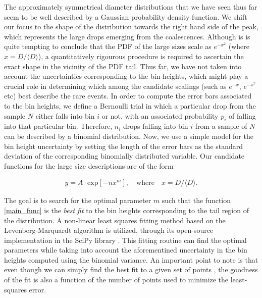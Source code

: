 The approximately symmetrical diameter distributions that we have seen 
thus far seem to be well described by a Gaussian probability density function. 
We shift our focus to the shape of the distribution towards the right hand 
side of the peak, which represents the large drops emerging from the coalescences.
Although is is quite tempting to conclude that the PDF of the large sizes 
scale as $e^{-x^{2}}$ (where $x = D/\langle D \rangle$), a quantitatively rigourous
procedure is required to ascertain the exact shape in the vicinity of the PDF tail.
Thus far, we have not taken into account the uncertainties corresponding to
the bin heights, which might play a crucial role in determining which among
the candidate scalings (such as $ e^{-x}$, $e^{-x^{2}}$ etc) best describe the rare events. 
In order to compute the error bars associated to the bin heights, we define 
a Bernoulli trial in which a particular drop from the sample $N$ either falls into
bin $i$ or not, with an associated probability $p_i$ of falling into that particular bin.
Therefore, $n_i$ drops falling into bin $i$ from a sample of $N$ can be described by a binomial distribution. 
Now, we use a simple model for the bin height uncertainty by setting the length 
of the error bars as the standard deviation 
of the corresponding binomially distributed variable. 
Our candidate functions for the large size descriptions are of the form 

\begin{align}
	y = A \cdot \textrm{exp}\left[-n x^m\right] , \quad \text{where} \quad x = D/\langle D \rangle . 
\label{main_func}
\end{align}

The goal is to search for the optimal parameter $m$ such that the function \eqref{main_func} 
is the \textit{best fit} to the bin heights corresponding to the tail region of the distribution.
A non-linear least squares fitting method based on the Levenberg-Marquardt algorithm 
is utilized, through its open-source implementation in the SciPy library \cite{scipy}. 
This fitting routine can find the optimal parameters while taking into account the 
aforementined uncertainty in the bin heights computed using the binomial variance. 
An important point to note is that even though we can simply find the best fit
to a given set of points , the goodness of the fit is also a function
of the number of points used to minimize the least-squares error. 

